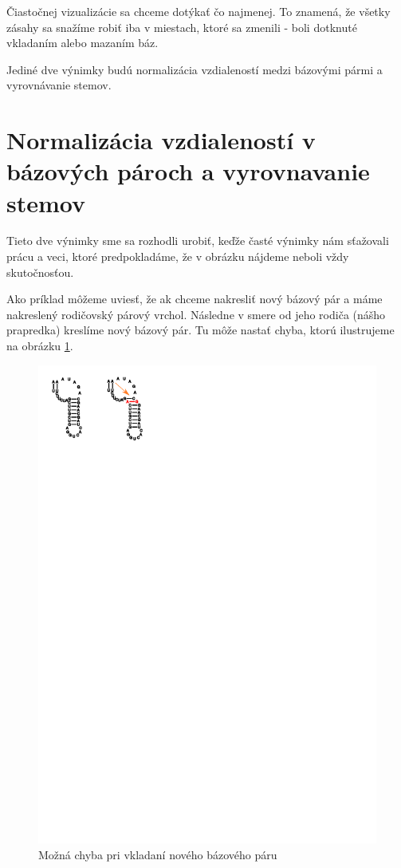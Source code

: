 Čiastočnej vizualizácie sa chceme dotýkať čo najmenej. To znamená, že všetky zásahy sa
snažíme robiť iba v miestach, ktoré sa zmenili - boli dotknuté vkladaním alebo mazaním báz.

Jediné dve výnimky budú normalizácia vzdialeností medzi bázovými pármi a vyrovnávanie stemov.





\section{Normalizácia vzdialeností v bázových pároch a vyrovnavanie stemov}

Tieto dve výnimky sme sa rozhodli urobiť, keďže časté výnimky nám sťažovali
prácu a veci, ktoré predpokladáme, že v obrázku nájdeme neboli vždy skutočnosťou.

Ako príklad môžeme uviesť, že ak chceme nakresliť nový bázový pár a máme nakreslený
rodičovský párový vrchol. Následne v smere od jeho rodiča (nášho prapredka) kreslíme nový
bázový pár. Tu môže nastať chyba, ktorú ilustrujeme na obrázku \ref{obr:insert_stem_error}.

\begin{figure}[H]
  \centering
  \includegraphics[clip, trim=0 24.5cm 14cm 0]{../img/alg/even_stem/error_insert}
  \caption{Možná chyba pri vkladaní nového bázového páru}
  \label{obr:insert_stem_error}
\end{figure}

